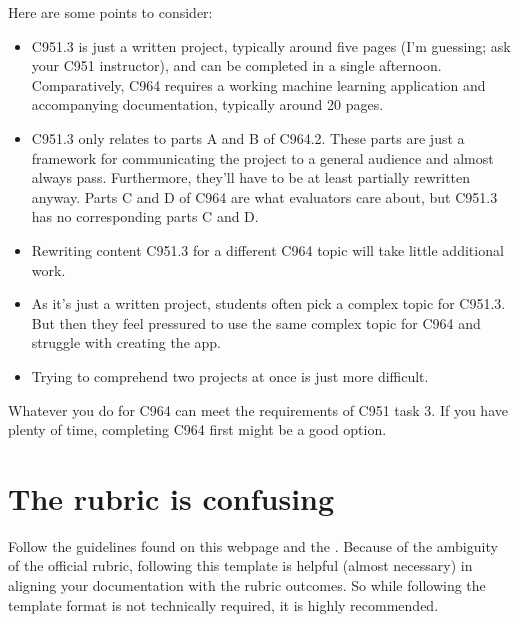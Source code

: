 \documentclass[letterpaper,10pt,english]{jupyterBook}
\begin{document}
\sphinxAtStartPar
Here are some points to consider:
\begin{itemize}
\item {} 
\sphinxAtStartPar
C951.3 is just a written project, typically around five pages (I’m guessing; ask your C951 instructor), and can be completed in a single afternoon. Comparatively, C964 requires a working machine learning application and accompanying documentation, typically around 20 pages.

\item {} 
\sphinxAtStartPar
C951.3 only relates to parts A and B of C964.2. These parts are just a framework for communicating the project to a general audience and almost always pass. Furthermore, they’ll have to be at least partially rewritten anyway. Parts C and D of C964 are what evaluators care about, but C951.3 has no corresponding parts C and D.

\item {} 
\sphinxAtStartPar
Rewriting content C951.3 for a different C964 topic will take little additional work.

\item {} 
\sphinxAtStartPar
As it’s just a written project, students often pick a complex topic for C951.3. But then they feel pressured to use the same complex topic for C964 and struggle with creating the app.

\item {} 
\sphinxAtStartPar
Trying to comprehend two projects at once is just more difficult.

\end{itemize}

\sphinxAtStartPar
Whatever you do for C964 can meet the requirements of C951 task 3. If you have plenty of time, completing C964 first might be a good option.


\section{The rubric is confusing}
\label{\detokenize{task2_doc/task2_doc:the-rubric-is-confusing}}\label{\detokenize{task2_doc/task2_doc:task1-faq-confusingrubric}}
\sphinxAtStartPar
{} Follow the guidelines found on this webpage and the . Because of the ambiguity of the official rubric, following this template is helpful (almost necessary) in aligning your documentation with the rubric outcomes. So while following the template format is not technically required, it is highly recommended.
\end{document}
